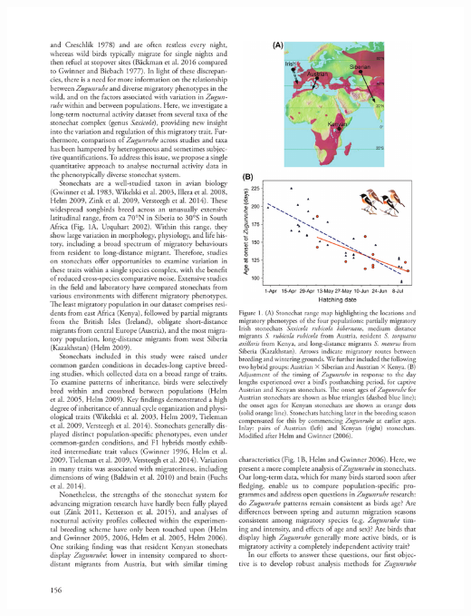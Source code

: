 \documentclass[a4paper, twoside]{templates/ociamthesis}
\begin{document}
\begin{center}\includegraphics[width=1\linewidth]{pdf_chapters/zug/zug_crop_Part02} \end{center}
\end{document}
